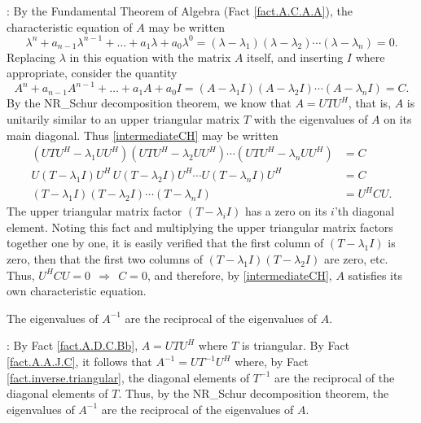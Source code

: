\/: By the Fundamental Theorem of Algebra (Fact \ref{fact.A.C.A.A}), the characteristic equation of $A$ may be written
\begin{equation*}
    \lambda^{n}+a_{n-1}\lambda^{n-1}+\ldots + a_{1}\lambda +a_{0} \lambda^0=
    (\lambda - \lambda_{1})(\lambda-\lambda_{2})\cdots (\lambda-\lambda_{n})=0.
\end{equation*}
Replacing $\lambda$ in this equation with the matrix $A$ itself, and inserting $I$ where appropriate,
consider the quantity
\begin{equation}
    A^{n}+a_{n-1}A^{n-1}+\ldots + a_{1}A+a_{0} I =
    (A - \lambda_{1}I)(A -\lambda_{2}I)\cdots (A -\lambda_{n}I) = C.
    \label{intermediateCH}
\end{equation}
By the NR_Schur decomposition theorem, we know that $A=UTU^{H}$, that is,
$A$ is unitarily similar to an upper triangular matrix $T$ with the eigenvalues of $A$
on its main diagonal.  Thus \eqref{intermediateCH} may be written
\begin{align*}
    (UTU^{H} - \lambda_{1}UU^{H})(UTU^{H} -\lambda_{2}UU^{H})\cdots (UTU^{H} -\lambda_{n}UU^{H}) &= C \\
    U(T - \lambda_{1}I)U^{H}\,U(T -\lambda_{2}I)U^{H}\cdots U(T -\lambda_{n}I) U^{H} &= C \\
    (T - \lambda_{1}I) (T -\lambda_{2}I) \cdots (T -\lambda_{n}I)  &= U^{H} C U.
\end{align*}
The upper triangular matrix factor $(T-\lambda_{i}I)$ has a zero on its $i$'th diagonal
element.  Noting this fact and multiplying the upper triangular matrix factors together one by one, it is
easily verified that the first column of $(T - \lambda_{1}I)$ is zero, then that
the first two columns of $(T - \lambda_{1}I) (T -\lambda_{2}I)$ are
zero, etc.  Thus, $U^{H}CU=0\ \ \Rightarrow\ \ C=0$, and therefore, by
\eqref{intermediateCH}, $A$ satisfies its own characteristic equation.  \endproof 

\begin{fact} \label{fact.A.D.C.Bd} The eigenvalues of $A^{-1}$ are the reciprocal of the eigenvalues of $A$.
\end{fact}

\/: By Fact \ref{fact.A.D.C.Bb}, $A=UTU^{H}$ where $T$ is triangular.  By
Fact \ref{fact.A.A.J.C}, it follows that $A^{-1}=UT^{-1}U^{H}$ where, by Fact \ref{fact.inverse.triangular}, the
diagonal elements of $T^{-1}$ are the reciprocal of the diagonal
elements of $T$.  Thus, by the NR_Schur decomposition theorem, the eigenvalues of $A^{-1}$ are the
reciprocal of the eigenvalues of $A$. \endproof

